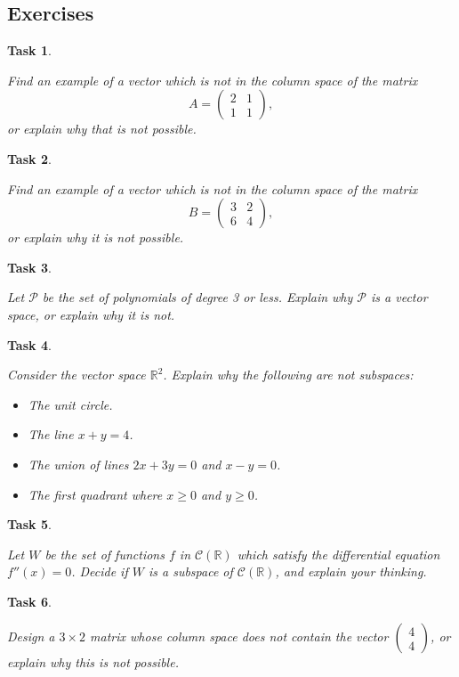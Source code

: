 \documentclass[10pt,]{book}
\theoremstyle{plain}
\numberwithin{equation}{section}
\newtheorem{task}{Task}[chapter]
\begin{document}
\subsection[Exercises]{Exercises}\label{subsection-62}
\begin{task}
\label{task-82}

        Find an example of a vector which is not in the column space of the
        matrix \[
        A = \begin{pmatrix} 2 & 1  \\ 1 & 1 \end{pmatrix},
        \] or explain why that is not possible.
      \end{task}
\begin{task}
\label{task-83}

        Find an example of a vector which is not in the column space of the
        matrix \[
        B = \begin{pmatrix} 3 & 2 \\ 6 & 4 \end{pmatrix},
        \] or explain why it is not possible.
      \end{task}
\begin{task}
\label{task-84}

        Let \(\mathcal{P}\) be the set of polynomials of degree 3 or less.
        Explain why \(\mathcal{P}\) is a vector space, or explain why it is not.
      \end{task}
\begin{task}
\label{task-85}

        Consider the vector space \(\mathbb{R}^2\). Explain why the following
        are not subspaces:
        \begin{itemize}
\item{}The unit circle.\item{}The line \(x+y = 4\).\item{}The union of lines \(2x+3y = 0\) and \(x-y=0\).\item{}The first quadrant where \(x\geq 0\) and \(y\geq 0\).\end{itemize}
\end{task}
\begin{task}
\label{task-86}

        Let \(W\) be the set of functions \(f\) in
        \(\mathcal{C}(\mathbb{R})\) which satisfy the differential equation
        \(f''(x) = 0\). Decide if \(W\) is a subspace of
        \(\mathcal{C}(\mathbb{R})\), and explain your thinking.
      \end{task}
\begin{task}
\label{task-87}

        Design a \(3\times 2\) matrix whose column space does not contain the
        vector \(\begin{pmatrix} 4 \\ 4 \end{pmatrix}\), or explain why this is
        not possible.
      \end{task}
\clearpage
\typeout{************************************************}
\typeout{************************************************}
\end{document}
